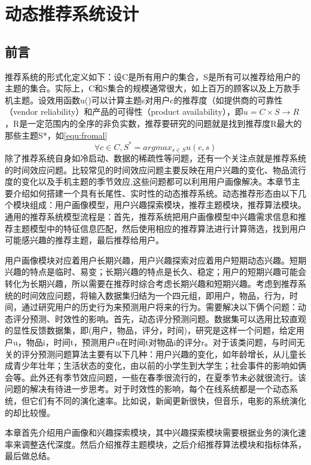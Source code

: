 
\chapter{动态推荐系统设计}
  \section{前言}
  推荐系统的形式化定义如下：设C是所有用户的集合，S是所有可以推荐给用户的主题的集合。实际上，C和S集合的规模通常很大，如上百万的顾客以及上万款手机主题。设效用函数u()可以计算主题s对用户c的推荐度（如提供商的可靠性（vendor reliability）和产品的可得性（product availability），即$u=C\times S \rightarrow R$，R是一定范围内的全序的非负实数，推荐要研究的问题就是找到推荐度R最大的那些主题S*，如\autoref{equ:fromal}
    \begin{equation}
    \forall c \in C,S^{*}=arg  max_{s \in S} u(c,s)
    \label{equ:fromal}
    \end{equation}
  除了推荐系统自身如冷启动、数据的稀疏性等问题，还有一个关注点就是推荐系统的时间效应问题。比较常见的时间效应问题主要反映在用户兴趣的变化、物品流行度的变化以及手机主题的季节效应,这些问题都可以利用用户画像解决。本章节主要介绍如何搭建一个具有长尾性、实时性的动态推荐系统。动态推荐形态由以下几个模块组成：用户画像模型，用户兴趣探索模块，推荐主题模块，推荐算法模块。通用的推荐系统模型流程是：首先，推荐系统把用户画像模型中兴趣需求信息和推荐主题模型中的特征信息匹配，然后使用相应的推荐算法进行计算筛选，找到用户可能感兴趣的推荐主题，最后推荐给用户。

  用户画像模块对应着用户长期兴趣，用户兴趣探索对应着用户短期动态兴趣。短期兴趣的特点是临时、易变；长期兴趣的特点是长久、稳定；用户的短期兴趣可能会转化为长期兴趣，所以需要在推荐时综合考虑长期兴趣和短期兴趣。考虑到推荐系统的时间效应问题，将输入数据集归结为一个四元组，即{用户，物品，行为，时间}，通过研究用户的历史行为来预测用户将来的行为。需要解决以下俩个问题：动态评分预测、时效性的影响。首先，动态评分预测问题。数据集可以选用比较直观的显性反馈数据集，即(用户，物品，评分，时间)，研究是这样一个问题，给定用户u，物品i，时间t，预测用户u在时间t对物品i的评分r。对于该类问题，与时间无关的评分预测问题算法主要有以下几种：用户兴趣的变化，如年龄增长，从儿童长成青少年壮年；生活状态的变化，由以前的小学生到大学生；社会事件的影响如俩会等。此外还有季节效应问题，一些在春季很流行的，在夏季节未必就很流行。该问题的解决有待进一步思考。对于时效性的影响，每个在线系统都是一个动态系统，但它们有不同的演化速率。比如说，新闻更新很快，但音乐，电影的系统演化的却比较慢。

  本章首先介绍用户画像和兴趣探索模块，其中兴趣探索模块需要根据业务的演化速率来调整迭代深度。然后介绍推荐主题模块，之后介绍推荐算法模块和指标体系，最后做总结。
  
